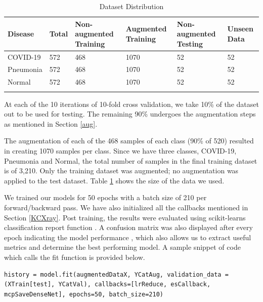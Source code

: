 \begin{longtable}{| p{} | p{} | p{} | p{} | p{} | p{} |} 

    \hline
\textbf{Disease} & \textbf{Total}    & \textbf{Non-augmented Training}   &\textbf{Augmented Training} &\textbf{Non-augmented Testing} & \textbf{Unseen Data} \\
\hline
			COVID-19    &572   &468    &1070   &52   &52
\\\hline
			Pneumonia   &572   &468    &1070   &52   &52
\\\hline
			Normal      &572   &468    &1070   &52   &52
\\\hline 

\caption{Dataset Distribution}

  \label{tab:Dataset Info}
    \end{longtable}
\vspace{-1em}
At each of the 10 iterations of 10-fold cross validation, we take 10\% of the dataset out to be used for testing. The remaining 90\% undergoes the augmentation steps as mentioned in Section \ref{aug}. 

The augmentation of each of the 468 samples of each class (90\% of 520) resulted in creating 1070 samples per class. Since we have three classes, COVID-19, Pneumonia and Normal, the total number of samples in the final training dataset is of 3,210. Only the training dataset was augmented; no augmentation was applied to the test dataset. Table \ref{tab:Dataset Info} shows the size of the data we used. 

We trained our models for 50 epochs with a batch size of 210 per forward/backward pass. We have also initialized all the callbacks mentioned in Section \ref{KCXray}. Post training, the results were evaluated using scikit-learns classification report function \cite{SCR}. A confusion matrix was also displayed after every epoch indicating the model performance \cite{SCM}, which also allows us to extract useful metrics and determine the best performing model. A sample snippet of code which calls the fit function is provided below.

\vspace{1em}
\begin{lstlisting}
history = model.fit(augmentedDataX, YCatAug, validation_data = (XTrain[test], YCatVal), callbacks=[lrReduce, esCallback, mcpSaveDenseNet], epochs=50, batch_size=210)
\end{lstlisting}

